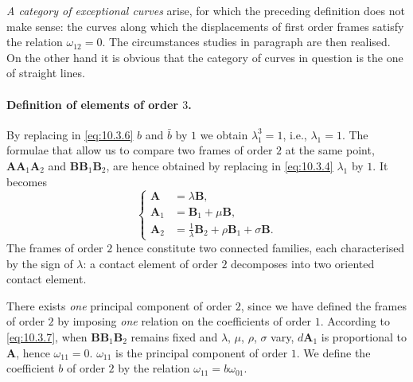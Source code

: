 \emph{A category of exceptional curves} arise, for which the preceding definition does not make sense: the curves along which the displacements of first order frames satisfy the relation $\omega_{12}=0$. The circumstances studies in paragraph  are then realised. On the other hand it is obvious that the category of curves in question is the one of straight lines.

\paragraph{Definition of elements of order $3$.}
\label{sec:144}
By replacing in \eqref{eq:10.3.6} $b$ and $\bar b$ by $1$ we obtain $\lambda^{3}_{1}=1$, i.e., $\lambda_{1}=1$. The formulae that allow us to compare two frames of order $2$ at the same point, $\mathbf{AA}_{1}\mathbf{A}_{2}$ and $\mathbf{BB}_{1}\mathbf{B}_{2}$, are hence obtained by replacing in \eqref{eq:10.3.4} $\lambda_{1}$ by $1$. It becomes
\begin{equation}
  \label{eq:10.3.7}
  \left\{
    \begin{aligned}
      \mathbf{A}_{\phantom{0}}&=\lambda\mathbf{B},\\
      \mathbf{A}_{1}&=\mathbf{B}_{1}+\mu\mathbf{B},\\
      \mathbf{A}_{2}&=\frac{1}{\lambda}\mathbf{B}_{2}+\rho\mathbf{B}_{1}+\sigma\mathbf{B}.
    \end{aligned}
  \right.
\end{equation}
The frames of order $2$ hence constitute two connected families, each characterised by the sign of $\lambda$: a contact element of order $2$ decomposes into two oriented contact element.

There exists \emph{one} principal component of order $2$, since we have defined the frames of order $2$ by imposing \emph{one} relation on the coefficients of order $1$. According to \eqref{eq:10.3.7}, when $\mathbf{BB}_{1}\mathbf{B}_{2}$ remains fixed and $\lambda$, $\mu$, $\rho$, $\sigma$ vary, $d\mathbf{A}_{1}$ is proportional to $\mathbf{A}$, hence $\omega_{11}=0$. $\omega_{11}$ is the principal component of order $1$. We define the coefficient $b$ of order $2$ by the relation $\omega_{11}=b\omega_{01}$.

